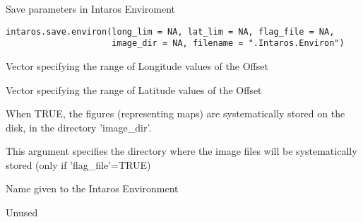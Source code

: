 %
\begin{Description}\relax
Save parameters in Intaros Enviroment
\end{Description}
%
\begin{Usage}
\begin{verbatim}
intaros.save.environ(long_lim = NA, lat_lim = NA, flag_file = NA,
                     image_dir = NA, filename = ".Intaros.Environ")
\end{verbatim}
\end{Usage}
%
\begin{Arguments}
\begin{ldescription}
\item[\code{long\_lim}] 
Vector specifying the range of Longitude values of the Offset

\item[\code{lat\_lim}] 
Vector specifying the range of Latitude values of the Offset

\item[\code{flag\_file}] 
When TRUE, the figures (representing maps) are systematically stored on
the disk, in the directory 'image\_dir'.

\item[\code{image\_dir}] 
This argument specifies the directory where the image files will be
systematically stored (only if 'flag\_file'=TRUE)

\item[\code{filename}] 
Name given to the Intaros Environment

\end{ldescription}
\end{Arguments}
%
\begin{Value}
Unused
\end{Value}
